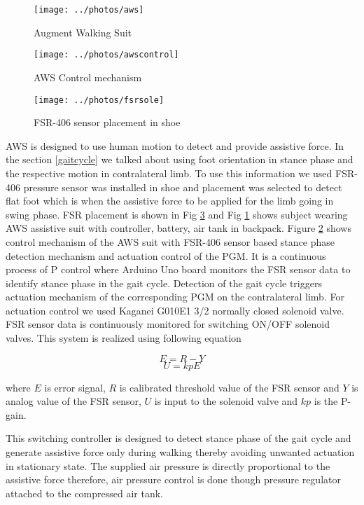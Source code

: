 \documentclass[letterpaper, 10 pt, conference]{ieeeconf}  %
\begin{document}
\begin{figure}
	\centering
	\texttt{[image: ../photos/aws]}
	\caption{Augment Walking Suit}
	\label{fig:aws}
\end{figure}


\begin{figure}
	\centering
	\texttt{[image: ../photos/awscontrol]}
	\caption{AWS Control mechanism}
	\label{fig:awssystem}
\end{figure}
\begin{figure}
	\centering
	\texttt{[image: ../photos/fsrsole]}
	\caption{FSR-406 sensor placement in shoe}
	\label{fig:fsrsole}
\end{figure}


AWS is designed to use human motion to detect and provide assistive force. In the section \ref{gaitcycle} we talked about using foot orientation in stance phase and the respective motion in contralateral limb. To use this information we used FSR-406 pressure sensor was installed in shoe and placement was selected to detect flat foot which is when the assistive force to be applied for the limb going in swing phase. FSR placement is shown in Fig \ref{fig:fsrsole} and Fig \ref {fig:aws} shows subject wearing AWS assistive suit with controller, battery, air tank in backpack. Figure \ref{fig:awssystem} shows control mechanism of the AWS suit with FSR-406 sensor based stance phase detection mechanism and actuation control of the PGM. It is a continuous process of P control where Arduino Uno board monitors the FSR sensor data to identify stance phase in the gait cycle. Detection of the gait cycle triggers actuation mechanism of the corresponding PGM on the contralateral limb. For actuation control we used Kaganei G010E1 3/2 normally closed solenoid valve. FSR sensor data is continuously monitored for switching ON/OFF solenoid valves. This system is realized using following equation 

\begin{equation}\label{kevalue}
E = R - Y 
\end{equation}
\begin{equation}\label{uvalue}
U = kpE
\end{equation}

where $E$ is error signal, $R$ is calibrated threshold value of the FSR sensor and $Y$ is analog value of the FSR sensor, $U$ is input to the solenoid valve and $kp$ is the P-gain. 

This switching controller is designed to detect stance phase of the gait cycle and generate assistive force only during walking thereby avoiding unwanted actuation in stationary state. The supplied air pressure is directly proportional to the assistive force therefore, air pressure control is done though pressure regulator attached to the compressed air tank.
\end{document}
